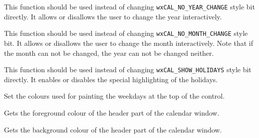\label{wxcalendarctrlenableyearchange}


This function should be used instead of changing {\tt wxCAL\_NO\_YEAR\_CHANGE}
style bit directly. It allows or disallows the user to change the year
interactively.


\label{wxcalendarctrlenablemonthchange}


This function should be used instead of changing 
{\tt wxCAL\_NO\_MONTH\_CHANGE} style bit. It allows or disallows the user to
change the month interactively. Note that if the month can not be changed, the
year can not be changed neither.


\label{wxcalendarctrlenableholidaydisplay}


This function should be used instead of changing {\tt wxCAL\_SHOW\_HOLIDAYS}
style bit directly. It enables or disables the special highlighting of the
holidays.


\label{wxcalendarctrlsetheadercolours}


Set the colours used for painting the weekdays at the top of the control.


\label{wxcalendarctrlgetheadercolourfg}


Gets the foreground colour of the header part of the calendar window.




\label{wxcalendarctrlgetheadercolourbg}


Gets the background colour of the header part of the calendar window.

